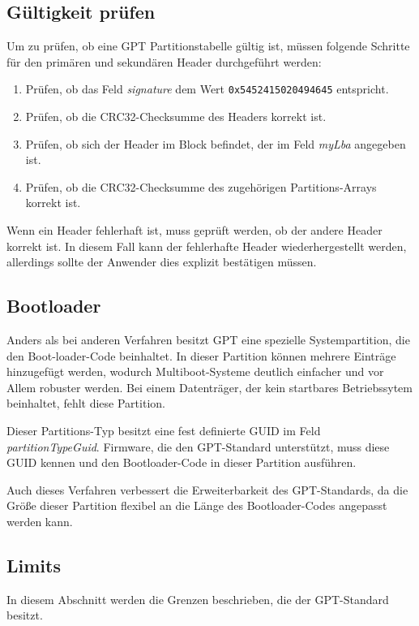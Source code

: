 \subsection{Gültigkeit prüfen}
Um zu prüfen, ob eine GPT Partitionstabelle gültig ist, müssen folgende Schritte für den primären und sekundären Header durchgeführt werden:

\begin{enumerate}
    \item Prüfen, ob das Feld \textit{signature} dem Wert \texttt{0x5452415020494645} entspricht.
    \item Prüfen, ob die CRC32-Checksumme des Headers korrekt ist.
    \item Prüfen, ob sich der Header im Block befindet, der im Feld \textit{myLba} angegeben ist.
    \item Prüfen, ob die CRC32-Checksumme des zugehörigen Partitions-Arrays korrekt ist.
\end{enumerate}

Wenn ein Header fehlerhaft ist, muss geprüft werden, ob der andere Header korrekt ist.
In diesem Fall kann der fehlerhafte Header wiederhergestellt werden, allerdings sollte der Anwender dies explizit bestätigen müssen.\cite{uefi-spec}

\newpage
\subsection{Bootloader}
\label{sec:gpt:bootloader}

Anders als bei anderen Verfahren besitzt GPT eine spezielle Systempartition, die den Boot-loader-Code beinhaltet.
In dieser Partition können mehrere Einträge hinzugefügt werden, wodurch Multiboot-Systeme deutlich einfacher und vor Allem robuster werden.\cite{heise-mbr-gpt}
Bei einem Datenträger, der kein startbares Betriebssytem beinhaltet, fehlt diese Partition.

Dieser Partitions-Typ besitzt eine fest definierte GUID im Feld \textit{partitionTypeGuid}.
Firmware, die den GPT-Standard unterstützt, muss diese GUID kennen und den Bootloader-Code in dieser Partition ausführen.

Auch dieses Verfahren verbessert die Erweiterbarkeit des GPT-Standards, da die Größe dieser Partition flexibel an die Länge des Bootloader-Codes angepasst werden kann.


\subsection{Limits}
In diesem Abschnitt werden die Grenzen beschrieben, die der GPT-Standard besitzt.


